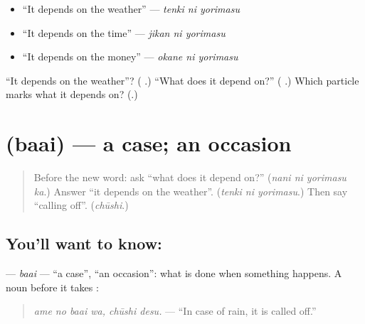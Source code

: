 \begin{itemize}
\raggedright
  \item \textquotedblleft{}It depends on the weather\textquotedblright{} — \emph{tenki ni yorimasu}
  \item \textquotedblleft{}It depends on the time\textquotedblright{} — \emph{jikan ni yorimasu}
  \item \textquotedblleft{}It depends on the money\textquotedblright{} — \emph{okane ni yorimasu}
\end{itemize}

\begin{tcolorbox}[breakable,colback=teal!4,colframe=teal!35!black,title={Before you move on}]
\textquotedblleft{}It depends on the weather\textquotedblright{}? (\textbf{ }.) \textquotedblleft{}What does it depend on?\textquotedblright{} (\textbf{ }.) Which particle marks what it depends on? (\textbf{}.)
\end{tcolorbox}
\section[\texorpdfstring{\ja{ばあい} (baai)}{ばあい (baai)}]{ (baai) — a case; an occasion}

\label{lesson:JA-C261-baai}



\begin{quote}
Before the new word: ask \textquotedblleft{}what does it depend on?\textquotedblright{} (\emph{nani ni yorimasu ka}.) Answer \textquotedblleft{}it depends on the weather\textquotedblright{}. (\emph{tenki ni yorimasu}.) Then say \textquotedblleft{}calling off\textquotedblright{}. (\emph{chūshi}.)
\end{quote}

\subsection*{You'll want to know: }
\textbf{} — \emph{baai} — \textquotedblleft{}a case\textquotedblright{}, \textquotedblleft{}an occasion\textquotedblright{}: what is done when something happens. A noun before it takes \textbf{}:

\begin{quote}
\textbf{ }
\end{quote}

\begin{quote}
\emph{ame no baai wa, chūshi desu.} — \textquotedblleft{}In case of rain, it is called off.\textquotedblright{}
\end{quote}

